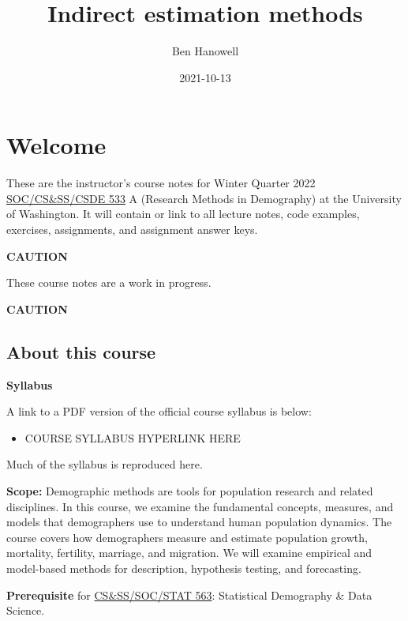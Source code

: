 \documentclass[
]{book}
\title{Indirect estimation methods}
\author{Ben Hanowell}
\date{2021-10-13}
\providecommand{\tightlist}{%
  \setlength{\itemsep}{0pt}\setlength{\parskip}{0pt}}
\begin{document}
\maketitle

{
\setcounter{tocdepth}{1}
\tableofcontents
}
\hypertarget{welcome}{%
\chapter*{Welcome}\label{welcome}}

These are the instructor's course notes for Winter Quarter 2022 \href{https://soc.washington.edu/courses/2019/winter/soc/533/a}{SOC/CS\&SS/CSDE 533} A (Research Methods in Demography) at the University of Washington. It will contain or link to all lecture notes, code examples, exercises, assignments, and assignment answer keys.

\textbf{CAUTION}

These course notes are a work in progress.

\textbf{CAUTION}

\hypertarget{about-this-course}{%
\section*{About this course}\label{about-this-course}}

\textbf{Syllabus}

A link to a PDF version of the official course syllabus is below:

\begin{itemize}
\tightlist
\item
  COURSE SYLLABUS HYPERLINK HERE
\end{itemize}

Much of the syllabus is reproduced here.

\textbf{Scope:} Demographic methods are tools for population research and related disciplines. In this course, we examine the fundamental concepts, measures, and models that demographers use to understand human population dynamics. The course covers how demographers measure and estimate population growth, mortality, fertility, marriage, and migration. We will examine empirical and model-based methods for description, hypothesis testing, and forecasting.

\textbf{Prerequisite} for \href{https://soc.washington.edu/courses/2019/spring/soc/563/a}{CS\&SS/SOC/STAT 563}: Statistical Demography \& Data Science.
\end{document}
